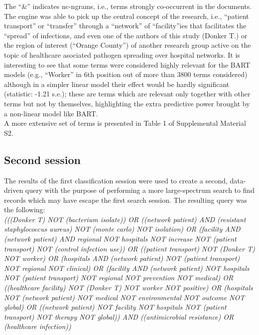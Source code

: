 \documentclass{article}
\begin{document}
The ``\&'' indicates nc-ngrams, i.e., terms strongly co-occurrent in the
documents.\\
The engine was able to pick up the central concept of the research,
i.e., ``patient transport'' or ``transfer'' through a ``network'' of
``facility''ies that facilitates the ``spread'' of infections, and even
one of the authors of this study (Donker T.) or the region of interest
(``Orange County'') of another research group active on the topic of
healthcare asociated pathogen spreading over hospital networks. It is
interesting to see that some terms were considered highly relevant for
the BART models (e.g., ``Worker'' in 6th position out of more than 3800
terms considered) although in a simpler linear model their effect would
be hardly significant (statistic: -1.21 s.e.); these are terms which are
relevant only together with other terms but not by themselves,
highlighting the extra predictive power brought by a non-linear model
like BART.\\
A more extensive set of terms is presented in Table 1 of Supplemental
Material S2.

\hypertarget{second-session}{%
\subsection{Second session}\label{second-session}}

The results of the first classification session were used to create a
second, data-driven query with the purpose of performing a more
large-spectrum search to find records which may have escape the first
search session. The resulting query was the following:\\

\emph{(((Donker T) NOT (bacterium isolate)) OR ((network patient) AND
(resistant staphylococcus aureus) NOT (monte carlo) NOT isolation) OR
(facility AND (network patient) AND regional NOT hospitals NOT increase
NOT (patient transport) NOT (control infection use)) OR ((patient
transport) NOT (Donker T) NOT worker) OR (hospitals AND (network
patient) NOT (patient transport) NOT regional NOT clinical) OR (facility
AND (network patient) NOT hospitals NOT (patient transport) NOT regional
NOT prevention NOT medical) OR ((healthcare facility) NOT (Donker T) NOT
worker NOT positive) OR (hospitals NOT (network patient) NOT medical NOT
environmental NOT outcome NOT global) OR ((network patient) NOT facility
NOT hospitals NOT (patient transport) NOT therapy NOT global)) AND
((antimicrobial resistance) OR (healthcare infection))}
\end{document}

